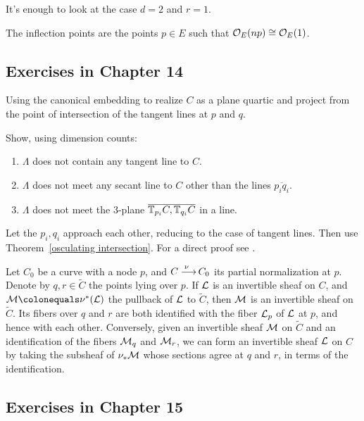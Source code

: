 It's enough to look at the case $d=2$ and $r=1$.

The inflection points are the points $p \in E$ such
that ${\mathcal O}_E(np) \cong {\mathcal O}_E(1)$.

\subsection*{Exercises in Chapter 14\nopunct}

 Using the canonical embedding to realize $C$ as a
plane quartic
%
and project from the point of intersection of the tangent lines at $p$ and $q$.

 Show, using dimension counts:
\begin{enumerate}
\item $\Lambda$ does not contain any tangent line to $C$.
\item $\Lambda$ does not meet any secant line to $C$ other than the
lines  $\overline{p_{i} q_{i}}$.
\item $\Lambda$ does not meet the 3-plane $\overline{{\mathbb T}_{p_i}C,
{\mathbb T}_{q_i}C}$ in a line.
\end{enumerate}

Let the $p_{i}, q_{i}$ approach each other, reducing to the case
of tangent lines. Then use
Theorem~\ref{osculating intersection}. 
For a direct proof see \cite[Lemma, p.~259]{Griffiths-Harris-BN}.

Let $C_{0}$ be a curve with a node $p$, and $C \ruto {\,\nu} C_{0}$
%
its
partial normalization
at $p$. Denote by $q,r \in \widetilde C$
the points lying over $p$. If ${\mathcal L}$ is an invertible sheaf on $C$, and
$\cM \colonequals  \nu^*(\cL)$ the pullback of ${\mathcal L}$ to $\widetilde C$,
then ${\mathcal M}$ is an invertible sheaf on $\widetilde C$. Its fibers over $q$
and $r$ are both identified with the fiber ${\mathcal L}_p$ of ${\mathcal L}$ at $p$, and
hence with each other. Conversely, given an invertible sheaf ${\mathcal M}$ on
$\widetilde C$ and an identification of the fibers ${\mathcal M}_q$ and ${\mathcal M}_r$,
we can form an invertible sheaf ${\mathcal L}$ on $C$ by taking the subsheaf
of $\nu_*{\mathcal M}$ whose sections agree at $q$ and $r$, in terms of the
identification.

\subsection*{Exercises in Chapter 15\nopunct}

